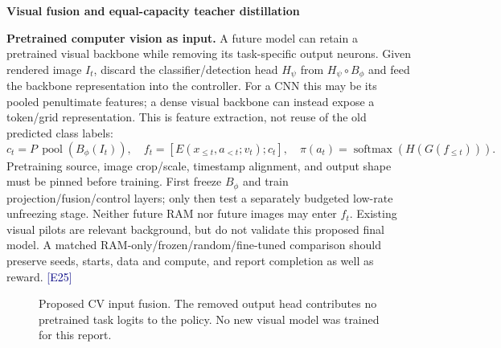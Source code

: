 \documentclass[11pt,a4paper]{article}
\newcommand{\topic}[2]{\vspace*{-4mm}{\small\color{teal}\textbf{#1}}\par{\LARGE\bfseries #2}\par\vspace{3mm}}
\newcommand{\ev}[1]{{\small\textcolor{navy}{[#1]}}}
\begin{document}
\newpage
\topic{10 / FUTURE WORK --- PROPOSED}{Visual fusion and equal-capacity teacher distillation}
\textbf{Pretrained computer vision as input.} A future model can retain a pretrained visual backbone while removing its task-specific output neurons. Given rendered image $I_t$, discard the classifier/detection head $H_\psi$ from $H_\psi\circ B_\phi$ and feed the backbone representation into the controller. For a CNN this may be its pooled penultimate features; a dense visual backbone can instead expose a token/grid representation. This is feature extraction, not reuse of the old predicted class labels:
\begin{equation}\label{eq:cv}
 c_t=P\,\operatorname{pool}(B_\phi(I_t)),\quad
 f_t=[E(x_{\le t},a_{<t};v_t);c_t],\quad \pi(a_t)=\operatorname{softmax}(H(G(f_{\le t}))).
\end{equation}
Pretraining source, image crop/scale, timestamp alignment, and output shape must be pinned before training. First freeze $B_\phi$ and train projection/fusion/control layers; only then test a separately budgeted low-rate unfreezing stage. Neither future RAM nor future images may enter $f_t$. Existing visual pilots are relevant background, but do not validate this proposed final model. A matched RAM-only/frozen/random/fine-tuned comparison should preserve seeds, starts, data and compute, and report completion as well as reward. \ev{E25}

\begin{figure}[ht]\centering
{}
\caption{Proposed CV input fusion. The removed output head contributes no pretrained task logits to the policy. No new visual model was trained for this report.}\label{fig:futurecv}
\end{figure}
\end{document}
